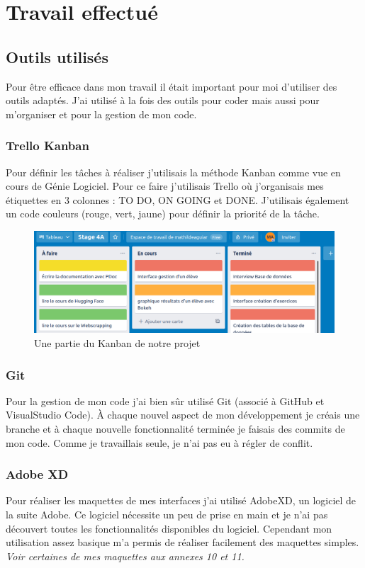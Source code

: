 \documentclass[12pt]{article}
\begin{document}
\section{Travail effectué}
\subsection{Outils utilisés}
Pour être efficace dans mon travail il était important pour moi d'utiliser des outils adaptés. J'ai utilisé à la fois des outils pour coder mais aussi pour m'organiser et pour la gestion de mon code. \\

\subsubsection{Trello Kanban}
Pour définir les tâches à réaliser j’utilisais la méthode Kanban comme vue en cours de Génie Logiciel. Pour ce faire j’utilisais Trello où j’organisais mes étiquettes en 3 colonnes : TO DO, ON GOING et DONE. J’utilisais également un code couleurs (rouge, vert, jaune) pour définir la priorité de la tâche. 

\begin{figure}[h]
    \centering
    \includegraphics[scale=0.4]{trello.png}
    \caption{Une partie du Kanban de notre projet}
    \label{fig:trello}
\end{figure}

\subsubsection{Git}
Pour la gestion de mon code j'ai bien sûr utilisé Git (associé à GitHub et VisualStudio Code). À chaque nouvel aspect de mon développement je créais une branche et à chaque nouvelle fonctionnalité terminée je faisais des commits de mon code. Comme je travaillais seule, je n'ai pas eu à régler de conflit. 

\subsubsection{Adobe XD}
Pour réaliser les maquettes de mes interfaces j'ai utilisé AdobeXD, un logiciel de la suite Adobe. Ce logiciel nécessite un peu de prise en main et je n'ai pas découvert toutes les fonctionnalités disponibles du logiciel. Cependant mon utilisation assez basique m'a permis de réaliser facilement des maquettes simples. \textit{Voir certaines de mes maquettes aux annexes 10 et 11.}
\end{document}
